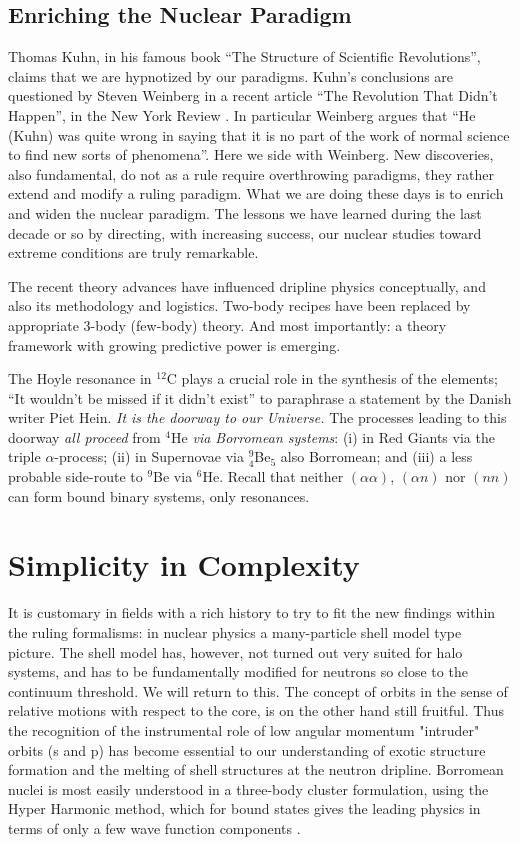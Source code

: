 \subsection{Enriching the Nuclear Paradigm}

Thomas Kuhn, in his famous book ``The Structure of Scientific
Revolutions'', claims that we are hypnotized by our paradigms.
Kuhn's conclusions are questioned by Steven Weinberg in a recent
article ``The Revolution That Didn't Happen'', in the New York
Review \cite{weinb}. In particular Weinberg argues that ``He
(Kuhn) was quite wrong in saying that it is no part of the work of
normal science to find new sorts of phenomena''. Here we side with
Weinberg. New  discoveries, also fundamental, do not as a rule
require overthrowing paradigms, they rather extend and modify a
ruling paradigm. What we are doing these days is to enrich and
widen the nuclear paradigm. The lessons we have learned during the
last decade or so by directing, with increasing success, our
nuclear studies toward extreme conditions are truly remarkable.

The recent theory advances have influenced dripline physics
conceptually, and also its methodology and logistics. Two-body
recipes have been replaced by appropriate 3-body (few-body)
theory. And most importantly: a theory framework with growing
predictive power is emerging.

The Hoyle resonance in $^{12}$C plays a crucial role in the
synthesis of the elements; ``It wouldn't be missed if it didn't
exist'' to paraphrase a statement by the Danish writer Piet Hein.
{\it It is the doorway to our Universe.} The processes leading to
this doorway {\it all proceed} from $^4$He {\it via Borromean
systems}: (i) in Red Giants via the triple $\alpha$-process; (ii)
in Supernovae via $^9 _4$Be$_5$ also Borromean; and (iii) a less
probable side-route to $^9$Be via $^6$He. Recall that neither
$(\alpha \alpha)$, $(\alpha n)$ nor $(n n)$ can form bound binary
systems, only resonances.

\section{Simplicity in Complexity}

It is customary in fields with a rich history to try to fit the
new findings within the ruling formalisms: in nuclear physics a
many-particle shell model type picture. The shell model has,
however, not turned out very suited for halo systems, and has to
be fundamentally modified for neutrons so close to the continuum
threshold. We will return to this. The concept of orbits in the
sense of relative motions with respect to the core, is on the
other hand still fruitful. Thus the recognition of the
instrumental role of low angular momentum "intruder" orbits (s and
p) has become essential to our understanding of exotic structure
formation and the melting of shell structures at the neutron
dripline. Borromean nuclei is most easily understood in a
three-body cluster formulation, using the Hyper Harmonic method,
which for bound states gives the leading physics in terms of only
a few wave function components \cite{zhuk}.

